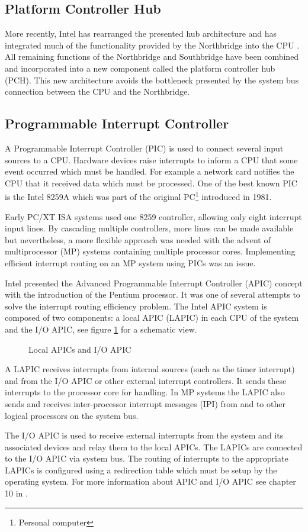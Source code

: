 \subsection{Platform Controller Hub}
More recently, Intel has rearranged the presented hub architecture and has
integrated much of the functionality provided by the Northbridge into the CPU
\cite{IntelQPI}. All remaining functions of the Northbridge and Southbridge have
been combined and incorporated into a new component called the platform
controller hub (PCH). This new architecture avoids the bottleneck
presented by the system bus connection between the CPU and the Northbridge.

\subsection{Programmable Interrupt Controller}\label{subsec:apic}
A Programmable Interrupt Controller (PIC) is used to connect several
input sources to a CPU. Hardware devices raise interrupts to inform a CPU that
some event occurred which must be handled. For example a network card notifies
the CPU that it received data which must be processed. One of the best known PIC
is the Intel 8259A which was part of the original PC\footnote{Personal
computer} introduced in 1981.

Early PC/XT ISA systems used one 8259 controller, allowing only eight
interrupt input lines. By cascading multiple controllers, more lines can be made
available but nevertheless, a more flexible approach was needed with the advent
of multiprocessor (MP) systems containing multiple processor cores.
Implementing efficient interrupt routing on an MP system using PICs was an
issue.

Intel presented the Advanced Programmable Interrupt Controller
(APIC) concept with the introduction of the Pentium processor. It
was one of several attempts to solve the interrupt routing efficiency problem.
The Intel APIC system is composed of two components: a local APIC
(LAPIC) in each CPU of the system and the I/O APIC, see figure
\ref{fig:apic} for a schematic view.

\begin{figure}[h]
	\centering
	
	\caption{Local APICs and I/O APIC}
	\label{fig:apic}
\end{figure}

A LAPIC receives interrupts from internal sources (such as the timer interrupt)
and from the I/O APIC or other external interrupt controllers. It sends these
interrupts to the processor core for handling. In MP systems the LAPIC also
sends and receives inter-processor interrupt messages (IPI) from and
to other logical processors on the system bus.

The I/O APIC is used to receive external interrupts from the system and its
associated devices and relay them to the local APICs. The LAPICs are connected
to the I/O APIC via system bus. The routing of interrupts to the appropriate
LAPICs is configured using a redirection table which must be setup by the
operating system. For more information about APIC and I/O APIC see chapter 10 in
\cite{IntelSDM}.
